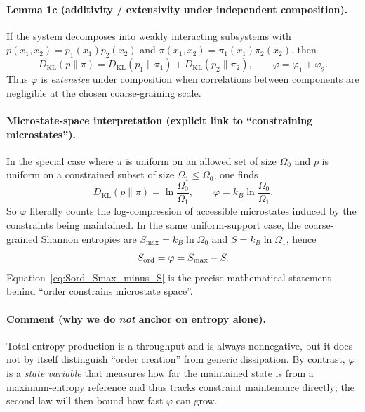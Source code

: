 \documentclass[10pt]{article}
\begin{document}
\paragraph{Lemma 1c (additivity / extensivity under independent composition).}
If the system decomposes into weakly interacting subsystems with
$p(x_1,x_2)=p_1(x_1)p_2(x_2)$ and $\pi(x_1,x_2)=\pi_1(x_1)\pi_2(x_2)$, then
\begin{equation}
D_{\mathrm{KL}}(p\|\pi)=D_{\mathrm{KL}}(p_1\|\pi_1)+D_{\mathrm{KL}}(p_2\|\pi_2),
\qquad
\varphi=\varphi_1+\varphi_2.
\label{eq:additivity}
\end{equation}
Thus $\varphi$ is \emph{extensive} under composition when correlations between components are
negligible at the chosen coarse-graining scale.

\paragraph{Microstate-space interpretation (explicit link to ``constraining microstates'').}
In the special case where $\pi$ is uniform on an allowed set of size $\Omega_0$ and $p$ is uniform
on a constrained subset of size $\Omega_1\le \Omega_0$, one finds
\begin{equation}
D_{\mathrm{KL}}(p\|\pi)=\ln\!\frac{\Omega_0}{\Omega_1},
\qquad
\varphi = k_B \ln\!\frac{\Omega_0}{\Omega_1}.
\label{eq:phi_microstates}
\end{equation}
So $\varphi$ literally counts the log-compression of accessible microstates induced by the
constraints being maintained.
In the same uniform-support case, the coarse-grained Shannon entropies are
$S_{\max}=k_B\ln \Omega_0$ and $S=k_B\ln \Omega_1$, hence
\begin{equation}
S_{\rm ord}=\varphi=S_{\max}-S.
\label{eq:Sord_Smax_minus_S}
\end{equation}
Equation~\eqref{eq:Sord_Smax_minus_S} is the precise mathematical statement behind
``order constrains microstate space''.

\paragraph{Comment (why we do \emph{not} anchor on entropy alone).}
Total entropy production is a throughput and is always nonnegative, but it does not by itself
distinguish ``order creation'' from generic dissipation. By contrast, $\varphi$ is a \emph{state
variable} that measures how far the maintained state is from a maximum-entropy reference and thus
tracks constraint maintenance directly; the second law will then bound how fast $\varphi$ can grow.
\end{document}
